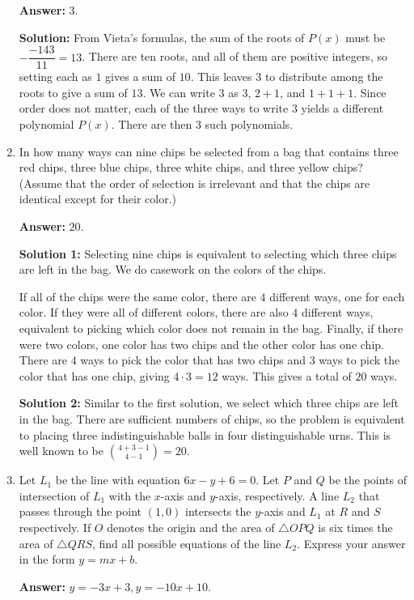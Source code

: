 \documentclass[11pt,paper=letter]{scrartcl}
\begin{document}
\begin{enumerate}[left=0pt]
\textbf{Answer:} $\boxed{3}$.

\textbf{Solution:} From Vieta's formulas, the sum of the roots of $P(x)$ must be $-\dfrac{-143}{11} = 13$. There are ten roots, and all of them are positive integers, so setting each as $1$ gives a sum of $10$. This leaves $3$ to distribute among the roots to give a sum of $13$. We can write $3$ as $3$, $2+1$, and $1+1+1$. Since order does not matter, each of the three ways to write $3$ yields a different polynomial $P(x)$. There are then $3$ such polynomials.

\item In how many ways can nine chips be selected from a bag that contains three red chips, three blue chips, three white chips, and three yellow chips? (Assume that the order of selection is irrelevant and that the chips are identical except for their color.)

\textbf{Answer:} $\boxed{20}$.

\textbf{Solution 1:} Selecting nine chips is equivalent to selecting which three chips are left in the bag. We do casework on the colors of the chips.

If all of the chips were the same color, there are $4$ different ways, one for each color. If they were all of different colors, there are also $4$ different ways, equivalent to picking which color does not remain in the bag. Finally, if there were two colors, one color has two chips and the other color has one chip. There are $4$ ways to pick the color that has two chips and $3$ ways to pick the color that has one chip, giving $4\cdot3 = 12$ ways. This gives a total of $20$ ways.

\textbf{Solution 2:} Similar to the first solution, we select which three chips are left in the bag. There are sufficient numbers of chips, so the problem is equivalent to placing three indistinguishable balls in four distinguishable urns. This is well known to be $\binom{4+3-1}{4-1} = 20$.

\item Let $L_1$ be the line with equation $6x - y + 6 = 0$. Let $P$ and $Q$ be the points of intersection of $L_1$ with the $x$-axis and $y$-axis, respectively. A line $L_2$ that passes through the point $(1,0)$ intersects the $y$-axis and $L_1$ at $R$ and $S$ respectively. If $O$ denotes the origin and the area of $\triangle OPQ$ is six times the area of $\triangle QRS$, find all possible equations of the line $L_2$. Express your answer in the form $y = mx + b$.

\textbf{Answer:} $\boxed{y = -3x + 3, y = -10x + 10}$.


\end{enumerate}
\end{document}
